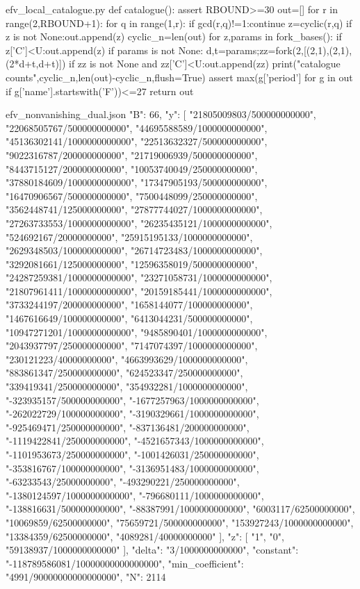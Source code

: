 \documentclass[12pt,a4paper]{article}
\numberwithin{equation}{section}
\theoremstyle{definition}
\begin{document}
\begin{filecontents*}[overwrite]{efv_local_catalogue.py}
def catalogue():
    assert RBOUND>=30
    out=[]
    for r in range(2,RBOUND+1):
      for q in range(1,r):
        if gcd(r,q)!=1:continue
        z=cyclic(r,q)
        if z is not None:out.append(z)
    cyclic_n=len(out)
    for z,params in fork_bases():
        if z['C']<U:out.append(z)
        if params is not None:
            d,t=params;zz=fork(2,[(2,1),(2,1),(2*d+t,d+t)])
            if zz is not None and zz['C']<U:out.append(zz)
    print("catalogue counts",cyclic_n,len(out)-cyclic_n,flush=True)
    assert max(g['period'] for g in out if g['name'].startswith('F'))<=27
    return out
\end{filecontents*}

\begin{filecontents*}[overwrite]{efv_nonvanishing_dual.json}
{
  "B": 66,
  "y": [
    "21805009803/500000000000",
    "22068505767/500000000000",
    "44695588589/1000000000000",
    "45136302141/1000000000000",
    "22513632327/500000000000",
    "9022316787/200000000000",
    "21719006939/500000000000",
    "8443715127/200000000000",
    "10053740049/250000000000",
    "37880184609/1000000000000",
    "17347905193/500000000000",
    "16470906567/500000000000",
    "7500448099/250000000000",
    "3562448741/125000000000",
    "27877744027/1000000000000",
    "27263733553/1000000000000",
    "26235435121/1000000000000",
    "524692167/20000000000",
    "25915195133/1000000000000",
    "2629348503/100000000000",
    "26714723483/1000000000000",
    "3292081661/125000000000",
    "12596358019/500000000000",
    "24287259381/1000000000000",
    "23271058731/1000000000000",
    "21807961411/1000000000000",
    "20159185441/1000000000000",
    "3733244197/200000000000",
    "1658144077/100000000000",
    "1467616649/100000000000",
    "6413044231/500000000000",
    "10947271201/1000000000000",
    "9485890401/1000000000000",
    "2043937797/250000000000",
    "7147074397/1000000000000",
    "230121223/40000000000",
    "4663993629/1000000000000",
    "883861347/250000000000",
    "624523347/250000000000",
    "339419341/250000000000",
    "354932281/1000000000000",
    "-323935157/500000000000",
    "-1677257963/1000000000000",
    "-262022729/100000000000",
    "-3190329661/1000000000000",
    "-925469471/250000000000",
    "-837136481/200000000000",
    "-1119422841/250000000000",
    "-4521657343/1000000000000",
    "-1101953673/250000000000",
    "-1001426031/250000000000",
    "-353816767/100000000000",
    "-3136951483/1000000000000",
    "-63233543/25000000000",
    "-493290221/250000000000",
    "-1380124597/1000000000000",
    "-796680111/1000000000000",
    "-138816631/500000000000",
    "-88387991/1000000000000",
    "6003117/62500000000",
    "10069859/62500000000",
    "75659721/500000000000",
    "153927243/1000000000000",
    "13384359/62500000000",
    "4089281/40000000000"
  ],
  "z": [
    "1",
    "0",
    "59138937/1000000000000"
  ],
  "delta": "3/1000000000000",
  "constant": "-118789586081/10000000000000000",
  "min_coefficient": "4991/90000000000000000",
  "N": 2114
}
\end{filecontents*}
\end{document}
